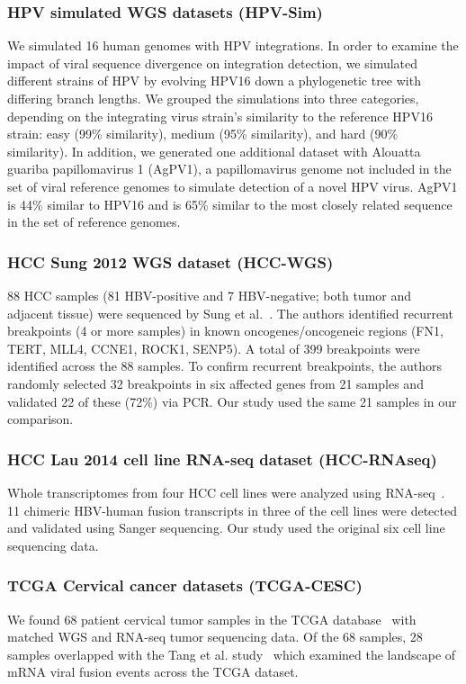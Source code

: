 \documentclass{bioinfo}
\begin{document}
\subsubsection{HPV simulated WGS datasets (HPV-Sim)}
We simulated 16 human genomes with HPV integrations.  In order to examine the impact of viral sequence divergence on integration detection, we simulated different strains of HPV by evolving HPV16 down a phylogenetic tree with differing branch lengths.  We grouped the simulations into three categories, depending on the integrating virus strain's similarity to the reference HPV16 strain: easy (99\% similarity), medium (95\% similarity), and hard (90\% similarity).  In addition, we generated one additional dataset with Alouatta guariba papillomavirus 1 (AgPV1), a papillomavirus genome not included in the set of viral reference genomes to simulate detection of a novel HPV virus.  AgPV1 is 44\% similar to HPV16 and is 65\% similar to the most closely related sequence in the set of reference genomes.


\subsubsection{HCC Sung 2012 WGS dataset (HCC-WGS)}
88 HCC samples (81 HBV-positive and 7 HBV-negative; both tumor and adjacent tissue) were sequenced by Sung et al.~\cite{Sung2012}.  The authors identified recurrent breakpoints (4 or more samples) in known oncogenes/oncogeneic regions (FN1, TERT, MLL4, CCNE1, ROCK1, SENP5).  A total of 399 breakpoints were identified across the 88 samples.  To confirm recurrent breakpoints, the authors randomly selected 32 breakpoints in six affected genes from 21 samples and validated 22 of these (72\%) via PCR.  Our study used the same 21 samples in our comparison.

\subsubsection{HCC Lau 2014 cell line RNA-seq dataset (HCC-RNAseq)}
Whole transcriptomes from four HCC cell lines were analyzed using RNA-seq~\cite{Lau2014}.  11 chimeric HBV-human fusion transcripts in three of the cell lines were detected and validated using Sanger sequencing.  Our study used the original six cell line sequencing data.  

\subsubsection{TCGA Cervical cancer datasets (TCGA-CESC)}
We found 68  patient cervical tumor samples in the TCGA database~\cite{TODO} with matched WGS and RNA-seq tumor sequencing data.  Of the 68 samples, 28 samples overlapped with the Tang et al. study~\cite{Tang2013} which examined the landscape of mRNA viral fusion events across the TCGA dataset.  
\end{document}
